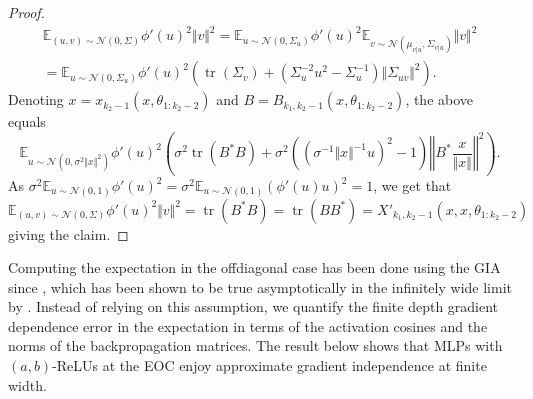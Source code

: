 \documentclass[twoside,11pt]{article}
\newcommand{\E}{\mathbb{E}}
\DeclareMathOperator{\tr}{tr}
\begin{document}
\begin{proof}
\begin{multline*}
\E_{(u,v) \sim \mathcal{N}(0,\Sigma)} \phi'(u)^2 \Vert v \Vert^2 
= \E_{u \sim \mathcal{N}(0,\Sigma_u)} \phi'(u)^2 \E_{v \sim \mathcal{N}(\mu_{v \vert u},\Sigma_{v \vert u})} \Vert v \Vert^2 \\
= \E_{u \sim \mathcal{N}(0,\Sigma_u)} \phi'(u)^2 (\tr(\Sigma_v) + (\Sigma_u^{-2} u^2 - \Sigma_u^{-1}) \Vert \Sigma_{uv} \Vert^2).
\end{multline*}
Denoting $x = x_{k_2-1}(x, \theta_{1 : k_2-2})$ and $B = B_{k_1,k_2-1}(x,\theta_{1:k_2-2})$, the above equals
\[
\E_{u \sim \mathcal{N}(0,\sigma^2 \Vert x \Vert^2)} \phi'( u )^2
\left( \sigma^2 \tr(B^* B) + \sigma^2 \left( \left( \sigma^{-1} \Vert x \Vert^{-1} u \right)^2 - 1 \right) \left\Vert B^* \frac{x}{\Vert x \Vert} \right\Vert^2 \right).
\]
As $\sigma^2 \E_{u \sim \mathcal{N}(0,1)} \phi'(u)^2 = \sigma^2 \E_{u \sim \mathcal{N}(0,1)} (\phi'(u)u)^2 = 1$, we get that
\[
\E_{(u,v) \sim \mathcal{N}(0,\Sigma)} \phi'(u)^2 \Vert v \Vert^2 
= \tr(B^* B) = \tr(B B^*) = X'_{k_1,k_2-1}(x,x,\theta_{1:k_2-2})
\]
giving the claim.
\end{proof}

Computing the expectation in the offdiagonal case has been done using the GIA since \citet{Jacotetal2018}, which has been shown to be true asymptotically in the infinitely wide limit by \citet{Yang2020}. Instead of relying on this assumption, we quantify the finite depth gradient dependence error in the expectation in terms of the activation cosines and the norms of the backpropagation matrices. The result below shows that MLPs with $(a,b)$-ReLUs at the EOC enjoy approximate gradient independence at finite width.
\end{document}
